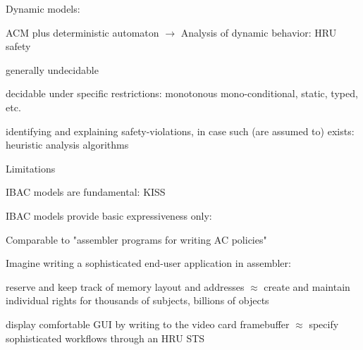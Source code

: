 \documentclass[a4paper]{article}
\begin{document}
\begin{multicols}{3}
\begin{itemize*}
\begin{itemize*}
\begin{itemize*}
                        \end{itemize*}
                  \item Dynamic models:
                        \begin{itemize*}
                            \item ACM plus deterministic automaton $\rightarrow$ Analysis of dynamic behavior: HRU safety
                                  \begin{itemize*}
                                      \item generally undecidable
                                      \item decidable under specific restrictions: monotonous mono-conditional, static, typed, etc.
                                      \item identifying and explaining safety-violations, in case such (are assumed to) exists: heuristic analysis algorithms
                                  \end{itemize*}
                        \end{itemize*}
              \end{itemize*}
        \item Limitations
              \begin{itemize*}
                  \item IBAC models are fundamental: KISS
                  \item IBAC models provide basic expressiveness only:
                        \begin{itemize*}
                            \item Comparable to "assembler programs for writing AC policies"
                            \item Imagine writing a sophisticated end-user application in assembler:
                                  \begin{itemize*}
                                      \item reserve and keep track of memory layout and addresses $\approx$ create and maintain individual rights for thousands of subjects, billions of objects
                                      \item display comfortable GUI by writing to the video card framebuffer $\approx$ specify sophisticated workflows through an HRU STS
                                  \end{itemize*}
                        \end{itemize*}

\end{itemize*}
\end{itemize*}
\end{multicols}
\end{document}
